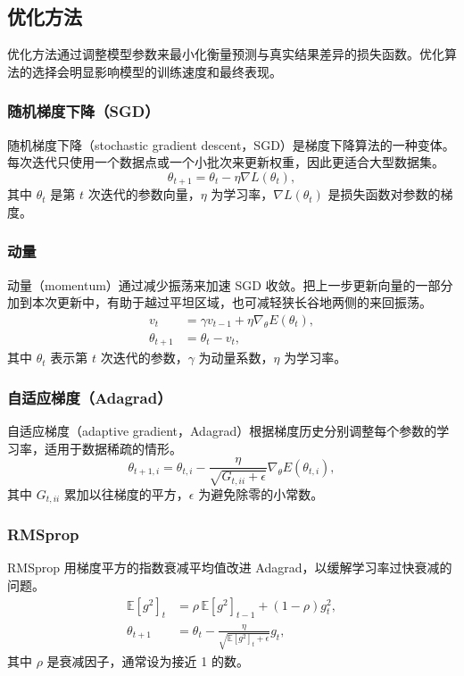\subsection{优化方法}
\label{sec:appa-optimization}
优化方法通过调整模型参数来最小化衡量预测与真实结果差异的损失函数。优化算法的选择会明显影响模型的训练速度和最终表现。

\subsubsection{随机梯度下降（SGD）}
随机梯度下降（stochastic gradient descent，SGD）是梯度下降算法的一种变体。每次迭代只使用一个数据点或一个小批次来更新权重，因此更适合大型数据集。
\begin{equation}
\theta_{t+1}=\theta_t-\eta\nabla L(\theta_t),
\label{eq:appa-sgd}
\end{equation}
其中 $\theta_t$ 是第 $t$ 次迭代的参数向量，$\eta$ 为学习率，$\nabla L(\theta_t)$ 是损失函数对参数的梯度。

\subsubsection{动量}
动量（momentum）通过减少振荡来加速 SGD 收敛。把上一步更新向量的一部分加到本次更新中，有助于越过平坦区域，也可减轻狭长谷地两侧的来回振荡。
\begin{align}
v_t&=\gamma v_{t-1}+\eta\nabla_\theta E(\theta_t),
\label{eq:appa-momentum-velocity}\\
\theta_{t+1}&=\theta_t-v_t,
\label{eq:appa-momentum-update}
\end{align}
其中 $\theta_t$ 表示第 $t$ 次迭代的参数，$\gamma$ 为动量系数，$\eta$ 为学习率。

\subsubsection{自适应梯度（Adagrad）}
自适应梯度（adaptive gradient，Adagrad）根据梯度历史分别调整每个参数的学习率，适用于数据稀疏的情形。
\begin{equation}
\theta_{t+1,i}=\theta_{t,i}-
\frac{\eta}{\sqrt{G_{t,ii}+\epsilon}}\nabla_\theta E(\theta_{t,i}),
\label{eq:appa-adagrad}
\end{equation}
其中 $G_{t,ii}$ 累加以往梯度的平方，$\epsilon$ 为避免除零的小常数。

\subsubsection{RMSprop}
RMSprop 用梯度平方的指数衰减平均值改进 Adagrad，以缓解学习率过快衰减的问题。
\begin{align}
\mathbb{E}[g^2]_t&=\rho\,\mathbb{E}[g^2]_{t-1}+(1-\rho)g_t^2,
\label{eq:appa-rmsprop-average}\\
\theta_{t+1}&=\theta_t-\frac{\eta}{\sqrt{\mathbb{E}[g^2]_t+\epsilon}}g_t,
\label{eq:appa-rmsprop-update}
\end{align}
其中 $\rho$ 是衰减因子，通常设为接近 1 的数。


